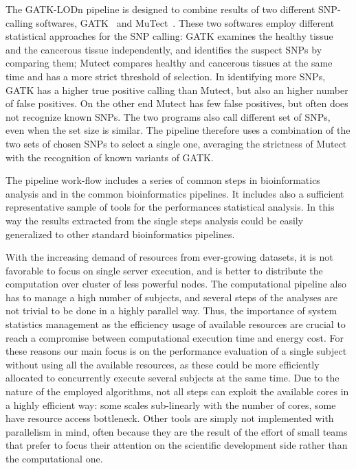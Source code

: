 \documentclass{standalone}
\begin{document}
The GATK-LODn pipeline is designed to combine results of two different SNP-calling softwares, GATK~\cite{McKenna2010} and MuTect~\cite{Cibulskis2013}.
These two softwares employ different statistical approaches for the SNP calling: GATK examines the healthy tissue and the cancerous tissue independently, and identifies the suspect SNPs by comparing them; Mutect compares healthy and cancerous tissues at the same time and has a more strict threshold of selection.
In identifying more SNPs, GATK has a higher true positive calling than Mutect, but also an higher number of false positives.
On the other end Mutect has few false positives, but often does not recognize known SNPs.
The two programs also call different set of SNPs, even when the set size is similar.
The pipeline therefore uses a combination of the two sets of chosen SNPs to select a single one, averaging the strictness of Mutect with the recognition of known variants of GATK.

The pipeline work-flow includes a series of common steps in bioinformatics analysis and in the common bioinformatics pipelines.
It includes also a sufficient representative sample of tools for the performances statistical analysis.
In this way the results extracted from the single steps analysis could be easily generalized to other standard bioinformatics pipelines.

With the increasing demand of resources from ever-growing datasets, it is not favorable to focus on single server execution, and is better to distribute the computation over cluster of less powerful nodes.
The computational pipeline also has to manage a high number of subjects, and several steps of the analyses are not trivial to be done in a highly parallel way.
Thus, the importance of system statistics management as the efficiency usage of available resources are crucial to reach a compromise between computational execution time and energy cost.
For these reasons our main focus is on the performance evaluation of a single subject without using all the available resources, as these could be more efficiently allocated to concurrently execute several subjects at the same time.
Due to the nature of the employed algorithms, not all steps can exploit the available cores in a highly efficient way: some scales sub-linearly with the number of cores, some have resource access bottleneck.
Other tools are simply not implemented with parallelism in mind, often because they are the result of the effort of small teams that prefer to focus their attention on the scientific development side rather than the computational one.
\end{document}
